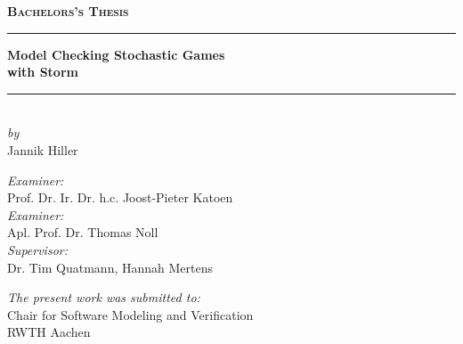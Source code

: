 \makeatletter
\begin{titlepage}

  \centering
  \vspace*{1cm}
  {\huge\textbf{\textsc{Bachelors's Thesis}}} \\ %
  \vspace{0.5cm}
  {\Huge{}
  \rule{\linewidth}{0.75pt} %
  \vspace*{-1.25cm}

  {\textbf{Model Checking Stochastic Games\\with Storm}} \\
  \vspace*{0.2cm} \rule{\linewidth}{0.75pt}} \\

  \vspace{1.5cm}
  {\large{}\textit{by}} \\
  \vspace{0.2cm}
  {\Large{}Jannik Hiller} \\ %
  \vspace{2cm}

  \textit{ Examiner:} \\
  Prof. Dr. Ir. Dr. h.c. Joost-Pieter Katoen\\[1em]
  \textit{ Examiner:} \\
  Apl. Prof. Dr. Thomas Noll\\[1em]
  \textit{Supervisor:} \\
  Dr. Tim Quatmann, Hannah Mertens
  \vspace{3em}
    
  \textit{The present work was submitted to:} \\
  Chair for Software Modeling and Verification 
  \\RWTH Aachen
  \vspace{1.5cm}

  \@date
\end{titlepage}
\makeatother